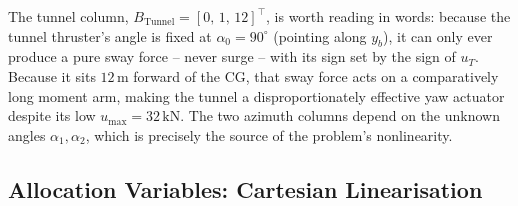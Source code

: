 \documentclass[10pt,conference]{IEEEtran}
\begin{document}
The tunnel column, $B_{\mathrm{Tunnel}}=[0,\,1,\,12]^\top$, is worth
reading in words: because the tunnel thruster's angle is fixed at
$\alpha_0=90^\circ$ (pointing along $y_b$), it can only ever produce a
pure sway force -- never surge -- with its sign set by the sign of
$u_T$. Because it sits $12\,\mathrm{m}$ forward of the CG, that sway
force acts on a comparatively long moment arm, making the tunnel a
disproportionately effective yaw actuator despite its low
$u_{\max}=32\,\mathrm{kN}$. The two azimuth columns depend on the
unknown angles $\alpha_1,\alpha_2$, which is precisely the source of
the problem's nonlinearity.

\subsection{Allocation Variables: Cartesian Linearisation}
\label{sec:z}
\end{document}
